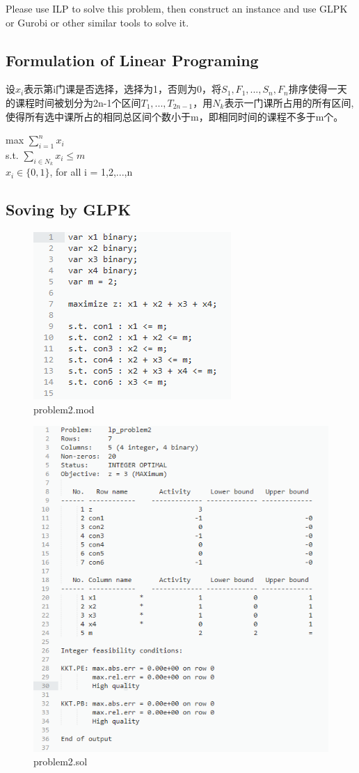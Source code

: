 \documentclass{article}
\begin{document}
Please use ILP to solve this problem, then construct an instance and use GLPK or Gurobi or other similar tools to solve it.



\subsection{Formulation of Linear Programing}
设$x_i$表示第i门课是否选择，选择为1，否则为0，将$S_1,F_1,...,S_n,F_n$排序使得一天的课程时间被划分为2n-1个区间$T_1,...,T_{2n-1}$，用$N_k$表示一门课所占用的所有区间,使得所有选中课所占的相同总区间个数小于m，即相同时间的课程不多于m个。

\begin{center}
max $\sum_{i=1}^nx_i$\\
s.t. $\sum_{i\in N_k}x_i \leq m$\\
$x_i \in \{0,1\}$, for all i = 1,2,...,n
\end{center} 

\subsection{Soving by GLPK}
\begin{figure}[h]
	\centering
	\includegraphics[width=0.4\linewidth]{problem2mod.png}
	\caption{problem2.mod} 
\end{figure}

\begin{figure}
	\centering
	\includegraphics[width=0.7\linewidth]{problem2sol.png}
	\caption{problem2.sol} 
\end{figure}
\end{document}
